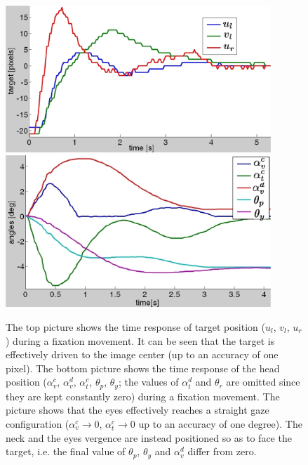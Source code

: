 \begin{figure}[!ht]
\centering
\includegraphics[width=100mm]{Figure/TimeResponseImage.eps}\\ \vspace{1cm}
\includegraphics[width=100mm]{Figure/TimeResponseEyesNeck.eps}
\caption{The top picture shows the time response of target position ($u_l$, $v_l$, $u_r$) during a fixation movement. It can be seen that the target is effectively driven to the image center (up to an accuracy of one pixel). The bottom picture shows the time response of the head position ($\alpha_v^c$, $\alpha_v^d$, $\alpha_t^c$, $\theta_p$, $\theta_y$; the values of $\alpha_t^d$ and $\theta_r$ are omitted since they are kept constantly zero) during a fixation movement. The picture shows that the eyes effectively reaches a straight gaze configuration ($\alpha_v^c \rightarrow 0$, $\alpha_t^c \rightarrow 0$ up to an accuracy of one degree). The neck and the eyes vergence are instead positioned so as to face the target, i.e. the final value of $\theta_p$, $\theta_y$ and $\alpha_v^d$ differ from zero.}
\label{Fig:TimeResponse}
\end{figure}
